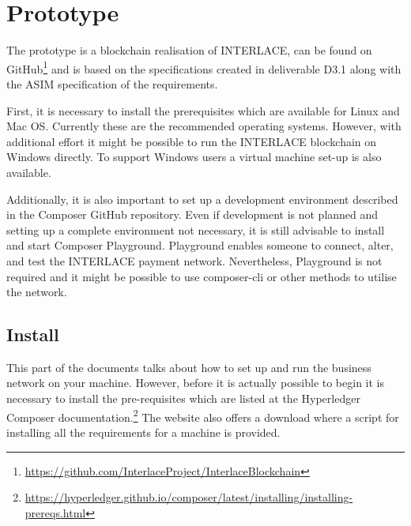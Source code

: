 

\section{Prototype}
\label{sec:prototype}

The prototype is a blockchain realisation of INTERLACE, can be found on GitHub\footnote{\url{https://github.com/InterlaceProject/InterlaceBlockchain}} and is based on the specifications created in deliverable D3.1 \cite{INTERLACE_D31} along with the ASIM specification of the requirements.

First, it is necessary to install the prerequisites which are available for Linux and Mac OS. Currently these are the recommended operating systems. However, with additional effort it might be possible to run the INTERLACE blockchain on Windows directly. To support Windows users a virtual machine set-up is also available.

Additionally, it is also important to set up a development environment described in the Composer GitHub repository. Even if development is not planned and setting up a complete environment not necessary, it is still advisable to install and start Composer Playground. Playground enables someone to connect, alter, and test the INTERLACE payment network. Nevertheless, Playground is not required and it might be possible to use composer-cli or other methods to utilise the network.

\subsection{Install}

This part of the documents talks about how to set up and run the business network on your machine. However, before it is actually possible to begin it is necessary to install the pre-requisites which are listed at the Hyperledger Composer documentation.\footnote{\url{https://hyperledger.github.io/composer/latest/installing/installing-prereqs.html}} The website also offers a download where a script for installing all the requirements for a machine is provided.

